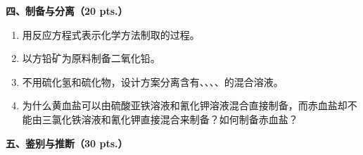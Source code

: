 \vspace{0.5cm}
\noindent\textbf{四、制备与分离（20 pts.）}

\begin{enumerate}[label=\arabic*., start=1, itemsep=1.5ex]
    \item 用反应方程式表示化学方法制取的过程。
    \item 以方铅矿为原料制备二氧化铅。
    \item 不用硫化氢和硫化物，设计方案分离含有、、、、的混合溶液。
    \item 为什么黄血盐可以由硫酸亚铁溶液和氰化钾溶液混合直接制备，而赤血盐却不能由三氯化铁溶液和氰化钾直接混合来制备？如何制备赤血盐？
\end{enumerate}

\vspace{0.5cm}
\noindent\textbf{五、鉴别与推断（30 pts.）}

